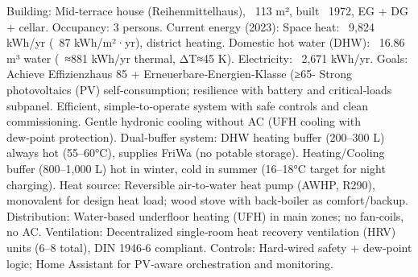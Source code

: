 \markdownRendererDocumentBegin
\markdownRendererSectionBegin
{}\markdownRendererInterblockSeparator
{}\markdownRendererUlBeginTight
\markdownRendererUlItem Building: Mid‑terrace house (Reihenmittelhaus), ~113 m², built ~1972, EG + DG + cellar.\markdownRendererUlItemEnd 
\markdownRendererUlItem Occupancy: 3 persons.\markdownRendererUlItemEnd 
\markdownRendererUlItem Current energy (2023):\markdownRendererUlItemEnd 
\markdownRendererUlItem Space heat: ~9,824 kWh/yr (~87 kWh/m²·yr), district heating.\markdownRendererUlItemEnd 
\markdownRendererUlItem Domestic hot water (DHW): ~16.86 m³ water (~≈881 kWh/yr thermal, ΔT≈45 K).\markdownRendererUlItemEnd 
\markdownRendererUlItem Electricity: ~2,671 kWh/yr.\markdownRendererUlItemEnd 
\markdownRendererUlItem Goals:\markdownRendererUlItemEnd 
\markdownRendererUlItem Achieve Effizienzhaus 85 + Erneuerbare‑Energien‑Klasse (≥65- Strong photovoltaics (PV) self‑consumption; resilience with battery and critical‑loads subpanel.\markdownRendererUlItemEnd 
\markdownRendererUlItem Efficient, simple‑to‑operate system with safe controls and clean commissioning.\markdownRendererUlItemEnd 
\markdownRendererUlItem Gentle hydronic cooling without AC (UFH cooling with dew‑point protection).\markdownRendererUlItemEnd 
\markdownRendererUlEndTight \markdownRendererInterblockSeparator
{}\markdownRendererSectionBegin
{}\markdownRendererInterblockSeparator
{}\markdownRendererUlBeginTight
\markdownRendererUlItem Dual‑buffer system:\markdownRendererUlItemEnd 
\markdownRendererUlItem DHW heating buffer (200–300 L) always hot (55–60°C), supplies FriWa (no potable storage).\markdownRendererUlItemEnd 
\markdownRendererUlItem Heating/Cooling buffer (800–1,000 L) hot in winter, cold in summer (16–18°C target for night charging).\markdownRendererUlItemEnd 
\markdownRendererUlItem Heat source: Reversible air‑to‑water heat pump (AWHP, R290), monovalent for design heat load; wood stove with back‑boiler as comfort/backup.\markdownRendererUlItemEnd 
\markdownRendererUlItem Distribution: Water‑based underfloor heating (UFH) in main zones; no fan‑coils, no AC.\markdownRendererUlItemEnd 
\markdownRendererUlItem Ventilation: Decentralized single‑room heat recovery ventilation (HRV) units (6–8 total), DIN 1946‑6 compliant.\markdownRendererUlItemEnd 
\markdownRendererUlItem Controls: Hard‑wired safety + dew‑point logic; Home Assistant for PV‑aware orchestration and monitoring.\markdownRendererUlItemEnd 
\markdownRendererUlEndTight \markdownRendererInterblockSeparator
{}
